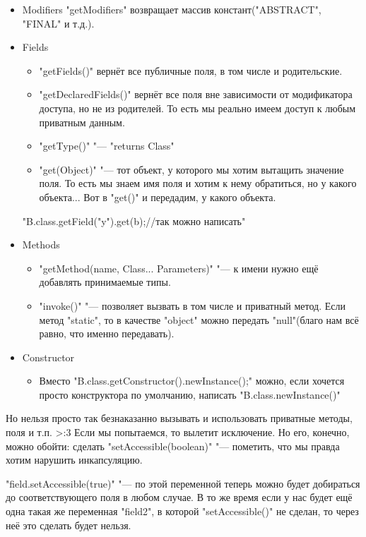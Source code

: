 \begin{itemize}
	\item{Modifiers}
		\java"getModifiers" возвращает массив констант(\java"ABSTRACT", \java"FINAL" и т.д.).
	\item{Fields}
		\begin{itemize}
			\item
				\java"getFields()" вернёт все публичные поля, в том числе и родительские.
			\item
				\java"getDeclaredFields()" вернёт все поля вне зависимости от модификатора доступа, но не из родителей. 
				То есть мы реально имеем доступ к любым приватным данным.
			\item
				\java"getType()" "--- \java"returns Class"
			\item
				\java"get(Object)" "--- тот объект, у которого мы хотим вытащить значение поля.
				То есть мы знаем имя поля и хотим к нему обратиться, но у какого объекта...
				Вот в \java"get()" и передадим, у какого объекта.
		\end{itemize}
		\java"B.class.getField("y").get(b);//так можно написать"
	\item{Methods}
		\begin{itemize}
			\item
				\java"getMethod(name, Class... Parameters)" "--- к имени нужно ещё добавлять принимаемые типы.
			\item	
				\java"invoke()" "--- позволяет вызвать в том числе и приватный метод. Если метод \java"static", 
				то в качестве \java"object" можно передать \java"null"(благо нам всё равно, что именно передавать).
		\end{itemize}
	\item{Constructor}
		\begin{itemize}
			\item
				Вместо \java"B.class.getConstructor().newInstance();" можно, 
				если хочется просто конструктора по умолчанию, написать \java"B.class.newInstance()"
		\end{itemize}
\end{itemize}

Но нельзя просто так безнаказанно вызывать и использовать приватные методы, поля и т.п. >:3
Если мы попытаемся, то вылетит исключение.
Но его, конечно, можно обойти: сделать \java"setAccessible(boolean)" "--- пометить, что мы правда хотим нарушить инкапсуляцию.

\java"field.setAccessible(true)" "--- по этой переменной теперь можно будет добираться до соответствующего поля в любом случае.
В то же время если у нас будет ещё одна такая же переменная \java"field2", в которой \java"setAccessible()" не сделан, 
то через неё это сделать будет нельзя.

